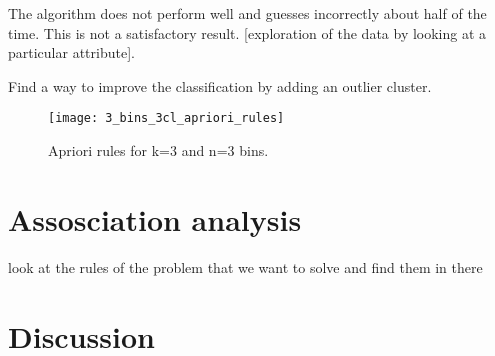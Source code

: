 \documentclass[letterpaper,12pt]{article}
\begin{document}
The algorithm does not perform well and guesses incorrectly about half of the time. This is not a satisfactory result. [exploration of the data by looking at a particular attribute].

Find a way to improve the classification by adding an outlier cluster.



\begin{figure}[H] 
  \centering
      \texttt{[image: 3\_bins\_3cl\_apriori\_rules]}
        \caption{
                \label{fig:3bins_3cl_apriori}  
                Apriori rules for k=3 and n=3 bins.
        }
\end{figure}



\section{Assosciation analysis}


look at the rules of the problem that we want to solve and find them in there



\section{Discussion}
\end{document}
